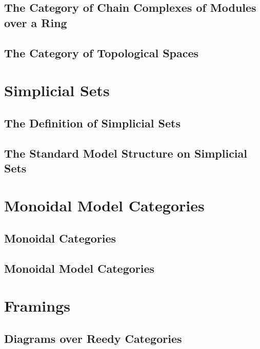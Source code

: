 \documentclass[12pt]{report}
\begin{document}


\subsection{The Category of Chain Complexes of Modules over a Ring}



\subsection{The Category of Topological Spaces}



\section{Simplicial Sets}

\subsection{The Definition of Simplicial Sets}



\subsection{The Standard Model Structure on Simplicial Sets}



\section{Monoidal Model Categories}

\subsection{Monoidal Categories}



\subsection{Monoidal Model Categories}



\section{Framings}

\subsection{Diagrams over Reedy Categories}
\end{document}
